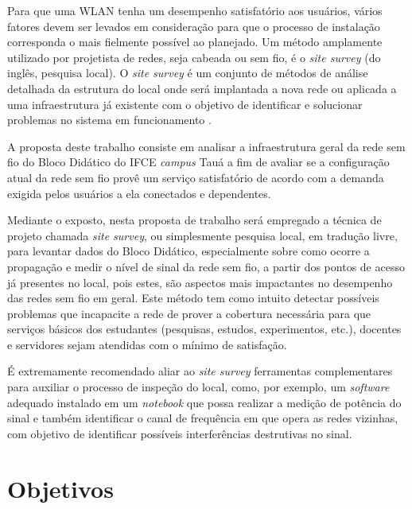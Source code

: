 Para que uma WLAN tenha um desempenho satisfatório aos usuários, vários fatores devem ser levados em consideração para que o processo de instalação corresponda o mais fielmente possível ao planejado. Um método amplamente utilizado por projetista de redes, seja cabeada ou sem fio, é o \textit{site survey} (do inglês, pesquisa local). O \textit{site survey} é um conjunto de métodos de análise detalhada da estrutura do local onde será implantada a nova rede ou aplicada a uma infraestrutura já existente com o objetivo de identificar e solucionar problemas no sistema em funcionamento \cite{pinheiro2004site}.

A proposta deste trabalho consiste em analisar a infraestrutura geral da rede sem fio do Bloco Didático do IFCE \textit{campus} Tauá a fim de avaliar se a configuração atual da rede sem fio provê um serviço satisfatório de acordo com a demanda exigida pelos usuários a ela conectados e dependentes.

Mediante o exposto, nesta proposta de trabalho será empregado a técnica de projeto chamada \textit{site survey}, ou simplesmente pesquisa local, em tradução livre, para levantar dados do Bloco Didático, especialmente sobre como ocorre a propagação e medir o nível de sinal da rede sem fio, a partir dos pontos de acesso já presentes no local, pois estes, são aspectos mais impactantes no desempenho das redes sem fio em geral.  Este método tem como intuito detectar possíveis problemas que incapacite a rede de prover a cobertura necessária para que serviços básicos dos estudantes (pesquisas, estudos, experimentos, etc.), docentes e servidores sejam atendidas com o mínimo de satisfação.

É extremamente recomendado aliar ao \textit{site survey} ferramentas complementares para auxiliar o processo de inspeção do local, como, por exemplo, um \textit{software} adequado instalado em um \textit{notebook} que possa realizar a medição de potência do sinal e também identificar o canal de frequência em que opera as redes vizinhas, com objetivo de identificar possíveis interferências destrutivas no sinal.

\section{Objetivos}
\label{sec:objetivos}

